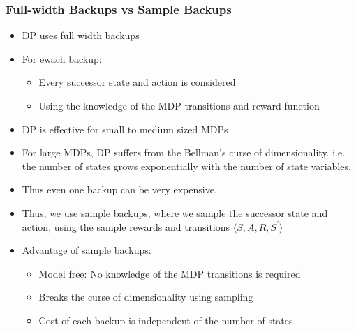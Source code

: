 \subsubsection{Full-width Backups vs Sample Backups}
\begin{itemize}
    \item DP uses full width backups
    \item For ewach backup:
    \begin{itemize}
        \item Every successor state and action is considered
        \item Using the knowledge of the MDP transitions and reward function
    \end{itemize}
    \item DP is effective for small to medium sized MDPs
    \item For large MDPs, DP suffers from the Bellman's curse of dimensionality. i.e.
    the number of states grows exponentially with the number of state variables.
    \item Thus even one backup can be very expensive.
    \item Thus, we use sample backups, where we sample the successor state and action, using
    the sample rewards and transitions \(\langle S, A, R, S^{\prime} \rangle \)
    \item Advantage of sample backups:
    \begin{itemize}
        \item Model free: No knowledge of the MDP transitions is required
        \item Breaks the curse of dimensionality using sampling
        \item Cost of each backup is independent of the number of states
    \end{itemize}
\end{itemize} 